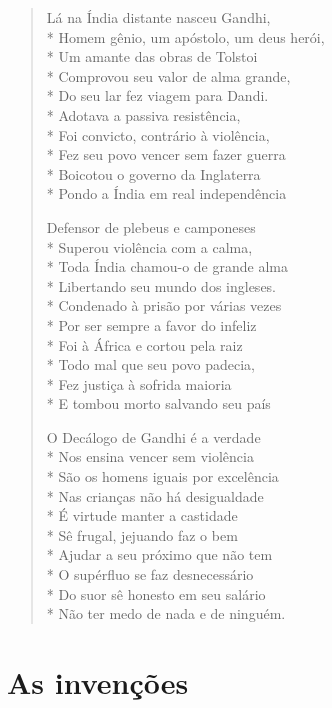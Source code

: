 \begin{verse}
Lá na Índia distante nasceu Gandhi,\\*
Homem gênio, um apóstolo, um deus herói,\\*
Um amante das obras de Tolstoi\\*
Comprovou seu valor de alma grande,\\*
Do seu lar fez viagem para Dandi.\\*
Adotava a passiva resistência,\\*
Foi convicto, contrário à violência,\\*
Fez seu povo vencer sem fazer guerra\\*
Boicotou o governo da Inglaterra\\*
Pondo a Índia em real independência

Defensor de plebeus e camponeses\\*
Superou violência com a calma,\\*
Toda Índia chamou-o de grande alma\\*
Libertando seu mundo dos ingleses.\\*
Condenado à prisão por várias vezes\\*
Por ser sempre a favor do infeliz\\*
Foi à África e cortou pela raiz\\*
Todo mal que seu povo padecia,\\*
Fez justiça à sofrida maioria\\*
E tombou morto salvando seu país

O Decálogo de Gandhi é a verdade\\*
Nos ensina vencer sem violência\\*
São os homens iguais por excelência\\*
Nas crianças não há desigualdade\\*
É virtude manter a castidade\\*
Sê frugal, jejuando faz o bem\\*
Ajudar a seu próximo que não tem\\*
O supérfluo se faz desnecessário\\*
Do suor sê honesto em seu salário\\*
Não ter medo de nada e de ninguém.
\end{verse}


\chapter{As invenções}

